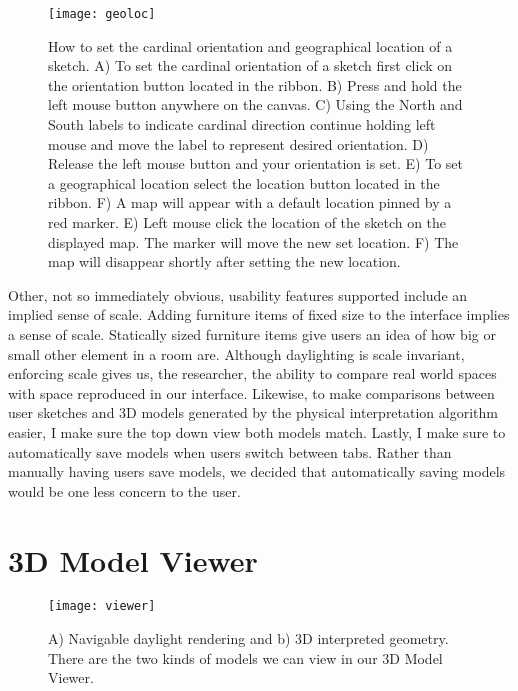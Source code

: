 		\begin{figure}[t]
		\centering
		\texttt{[image: geoloc]}
		\caption{How to set the cardinal orientation and geographical location of a sketch.
		A) To set the cardinal orientation of a sketch first click on the orientation button located in the ribbon.
		B) Press and hold the left mouse button anywhere on the canvas.
		C) Using the North and South labels to indicate cardinal direction continue holding left mouse and move the label to represent desired orientation.
		D) Release the left mouse button and your orientation is set.
		E) To set a geographical location select the location button located in the ribbon.
		F) A map will appear with a default location pinned by a red marker.
		E) Left mouse click the location of the sketch on the displayed map. The marker will move  the new set location.
		F) The map will disappear shortly after setting the new location.}
		\label{fig:geoloc}
		\end{figure}

		Other, not so immediately obvious, usability features supported include an implied sense of scale.
		Adding furniture items of fixed size to the interface implies a sense of scale.
		Statically sized furniture items give users an idea of how big or small other element in a room are.
		Although daylighting is scale invariant, enforcing scale gives us, the researcher, the ability to compare real world spaces with space reproduced in our interface.
		Likewise, to make comparisons between user sketches and 3D models generated by the physical interpretation algorithm easier, I make sure the top down view both models match.
		Lastly, I make sure to automatically save models when users switch between tabs.
		Rather than manually having users save models, we decided that automatically saving models would be one less concern to the user.


\section{3D Model Viewer}

	\begin{figure}[t]
	\centering
	\texttt{[image: viewer]}
	\caption{ A) Navigable daylight rendering and b) 3D interpreted geometry. There are the two kinds of models we can view in our 3D Model Viewer.}
	\label{fig:viewer}
	\end{figure}

